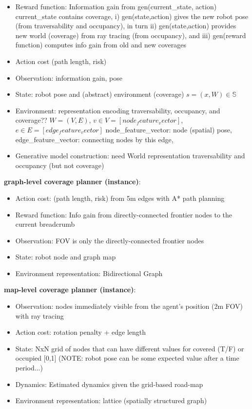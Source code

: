 \documentclass{article}
\newcommand{\ph}[1]{{\textbf{#1}:}} %
\begin{document}
\begin{itemize}
    \item Reward function: Information gain from gen(current\_state, action)
    current\_state contains coverage, i) gen(state,action) gives the new robot pose (from traversability and occupancy), in turn ii) gen(state,action) provides new world (coverage) from ray tracing (from occupancy), and iii) gen(reward function) computes info gain from old and new coverages
    \item Action cost (path length, risk)
    \item Observation: information gain, pose
    \item State: robot pose and (abstract) environment (coverage)
    $s = (x, W) \in \mathbb{S}$
    \item Environment: representation encoding traversability, occupancy, and coverage??
    $W = (V, E)$, $v \in V = [node_feature_vector]$, $e \in E = [edge_feature_vector]$
    node\_feature\_vector: node (spatial) pose, 
    edge\_feature\_vector: connecting nodes by this edge, 
    \item Generative model construction: need World representation traversability and occupancy (but not coverage)
\end{itemize}


\ph{graph-level coverage planner (instance)}

\begin{itemize}
    \item Action cost: (path length, risk) from 5m edges with A* path planning
    \item Reward function: Info gain from directly-connected frontier nodes to the current breadcrumb
    \item Observation: FOV is only the directly-connected frontier nodes
    \item State: robot node and graph map
    \item Environment representation: Bidirectional Graph
\end{itemize}


\ph{map-level coverage planner (instance)}
\begin{itemize}
    \item Observation: nodes immediately visible from the agent's position (2m FOV) with ray tracing
    \item Action cost: rotation penalty + edge length
    \item State: NxN grid of nodes that can have different values for covered (T/F) or occupied [0,1]
        (NOTE: robot pose can be some expected value after a time period...)
    \item Dynamics: Estimated dynamics given the grid-based road-map
    \item Environment representation: lattice (spatially structured graph)

\end{itemize}
\end{document}
